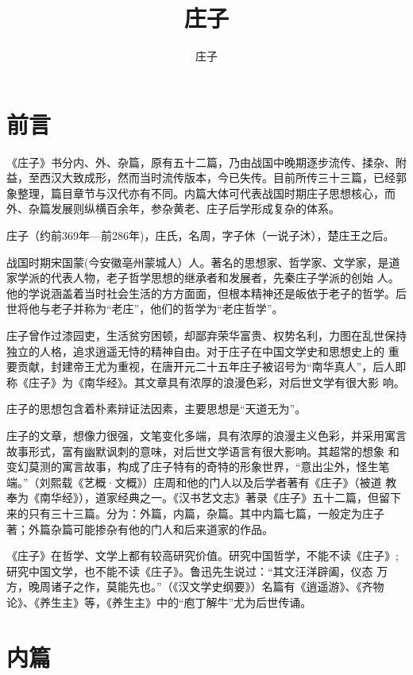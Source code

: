 \documentclass[12pt,UTF8]{ctexbook}
\title{\heiti\zihao{0} 庄子}
\author{庄子}
\date{}
\begin{document}
\maketitle
\tableofcontents

\frontmatter

\chapter{前言}

《庄子》书分内、外、杂篇，原有五十二篇，乃由战国中晚期逐步流传、揉杂、附益，至西汉大致成形，然而当时流传版本，今已失传。目前所传三十三篇，已经郭象整理，篇目章节与汉代亦有不同。内篇大体可代表战国时期庄子思想核心，而外、杂篇发展则纵横百余年，参杂黄老、庄子后学形成复杂的体系。

庄子（约前369年—前286年)，庄氏，名周，字子休（一说子沐），楚庄王之后。

战国时期宋国蒙(今安徽亳州蒙城人）人。著名的思想家、哲学家、文学家，是道家学派的代表人物，老子哲学思想的继承者和发展者，先秦庄子学派的创始 人。他的学说涵盖着当时社会生活的方方面面，但根本精神还是皈依于老子的哲学。后世将他与老子并称为“老庄”，他们的哲学为“老庄哲学”。

庄子曾作过漆园吏，生活贫穷困顿，却鄙弃荣华富贵、权势名利，力图在乱世保持独立的人格，追求逍遥无恃的精神自由。对于庄子在中国文学史和思想史上的 重要贡献，封建帝王尤为重视，在唐开元二十五年庄子被诏号为“南华真人”，后人即称《庄子》为《南华经》。其文章具有浓厚的浪漫色彩，对后世文学有很大影 响。

庄子的思想包含着朴素辩证法因素，主要思想是“天道无为”。

庄子的文章，想像力很强，文笔变化多端，具有浓厚的浪漫主义色彩，并采用寓言故事形式，富有幽默讽刺的意味，对后世文学语言有很大影响。其超常的想象 和变幻莫测的寓言故事，构成了庄子特有的奇特的形象世界，“意出尘外，怪生笔端。”（刘熙载《艺概·文概》）庄周和他的门人以及后学者著有《庄子》（被道 教奉为《南华经》），道家经典之一。《汉书艺文志》著录《庄子》五十二篇，但留下来的只有三十三篇。分为：外篇，内篇，杂篇。其中内篇七篇，一般定为庄子 著；外篇杂篇可能掺杂有他的门人和后来道家的作品。

《庄子》在哲学、文学上都有较高研究价值。研究中国哲学，不能不读《庄子》;研究中国文学，也不能不读《庄子》。鲁迅先生说过：“其文汪洋辟阖，仪态 万方，晚周诸子之作，莫能先也。”（《汉文学史纲要》）名篇有《逍遥游》、《齐物论》、《养生主》等，《养生主》中的“庖丁解牛”尤为后世传诵。 

\mainmatter

\chapter{内篇}
\end{document}
